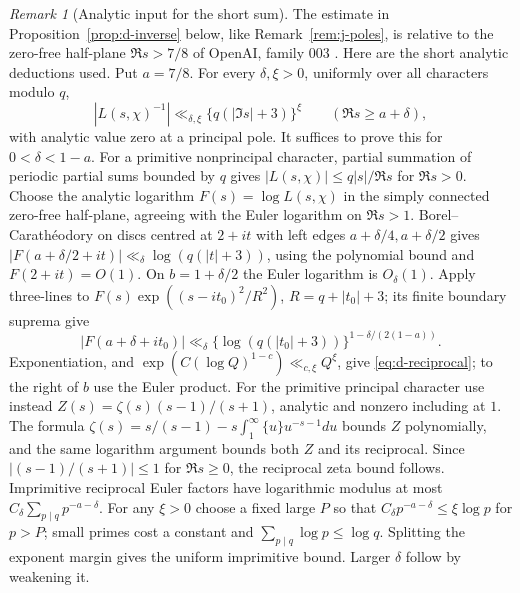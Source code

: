 \documentclass[11pt]{article}
\theoremstyle{definition}
\theoremstyle{remark}
\newtheorem{remark}[theorem]{Remark}
\numberwithin{equation}{section}
\begin{document}
\begin{remark}[Analytic input for the short sum]\label{rem:analytic-input}
The estimate in Proposition~\ref{prop:d-inverse} below, like Remark~\ref{rem:j-poles}, is relative to
the zero-free half-plane $\Re s>7/8$ of OpenAI, family 003 \cite{OpenAI003}.
Here are the short analytic deductions used. Put $a=7/8$.
For every $\delta,\xi>0$, uniformly over all characters modulo $q$,
\begin{equation}\label{eq:d-reciprocal}
 |L(s,\chi)^{-1}|\ll_{\delta,\xi}\{q(|\Im s|+3)\}^{\xi}
 \qquad(\Re s\ge a+\delta),
\end{equation}
with analytic value zero at a principal pole.
It suffices to prove this for $0<\delta<1-a$.
For a primitive nonprincipal character, partial summation of periodic partial sums bounded by $q$
gives $|L(s,\chi)|\le q|s|/\Re s$ for $\Re s>0$.
Choose the analytic logarithm $F(s)=\log L(s,\chi)$ in the simply connected zero-free half-plane,
agreeing with the Euler logarithm on $\Re s>1$.
Borel--Carath\'eodory on discs centred at $2+it$ with left edges $a+\delta/4,a+\delta/2$ gives
$|F(a+\delta/2+it)|\ll_\delta\log(q(|t|+3))$, using the polynomial bound and $F(2+it)=O(1)$.
On $b=1+\delta/2$ the Euler logarithm is $O_\delta(1)$.
Apply three-lines to $F(s)\exp((s-it_0)^2/R^2)$, $R=q+|t_0|+3$; its finite boundary suprema give
\begin{equation}\label{eq:d-log-bound}
 |F(a+\delta+it_0)|\ll_\delta
 \{\log(q(|t_0|+3))\}^{1-\delta/(2(1-a))}.
\end{equation}
Exponentiation, and $\exp(C(\log Q)^{1-c})\ll_{c,\xi}Q^\xi$, give \eqref{eq:d-reciprocal}; to the
right of $b$ use the Euler product. For the primitive principal character use instead
$Z(s)=\zeta(s)(s-1)/(s+1)$, analytic and nonzero including at $1$.
The formula $\zeta(s)=s/(s-1)-s\int_1^\infty\{u\}u^{-s-1}du$ bounds $Z$ polynomially, and the same
logarithm argument bounds both $Z$ and its reciprocal. Since $|(s-1)/(s+1)|\le1$ for $\Re s\ge0$,
the reciprocal zeta bound follows. Imprimitive reciprocal Euler factors have logarithmic modulus at
most $C_\delta\sum_{p\mid q}p^{-a-\delta}$.
For any $\xi>0$ choose a fixed large $P$ so that $C_\delta p^{-a-\delta}\le\xi\log p$ for $p>P$;
small primes cost a constant and $\sum_{p\mid q}\log p\le\log q$.
Splitting the exponent margin gives the uniform imprimitive bound. Larger $\delta$ follow by weakening it.


\end{remark}
\end{document}
